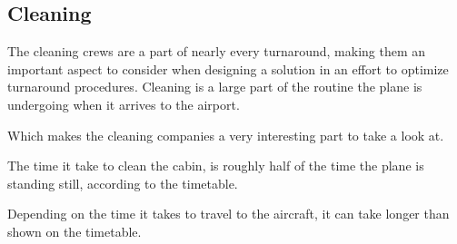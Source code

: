 \subsection{Cleaning}
The cleaning crews are a part of nearly every turnaround, making them an important aspect to consider when designing a solution in an effort to optimize turnaround procedures.
Cleaning is a large part of the routine the plane is undergoing when it arrives to the airport.

Which makes the cleaning companies a very interesting part to take a look at.

The time it take to clean the cabin, is roughly half of the time the plane is standing still, according to the timetable.

Depending on the time it takes to travel to the aircraft, it can take longer than shown on the timetable.